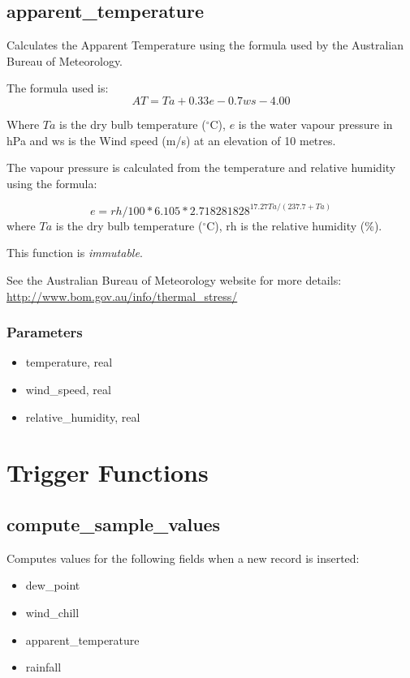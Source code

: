 \documentclass[a4paper,10pt]{book}
\begin{document}
\subsection{apparent\_temperature}
\label{apparent_temperature}
Calculates the Apparent Temperature using the formula used by the Australian Bureau of Meteorology.

The formula used is:
$$AT = Ta + 0.33e - 0.7ws - 4.00$$

Where $Ta$ is the dry bulb temperature ($^{\circ}$C), $e$ is the water vapour pressure in hPa and ws is the Wind speed (m/s) at an elevation of 10 metres.

The vapour pressure is calculated from the temperature and relative humidity using the formula:

$$  e = rh / 100 * 6.105 * 2.718281828 ^ { 17.27Ta / (237.7 + Ta ) }$$
where $Ta$ is the dry bulb temperature ($^{\circ}$C), rh is the relative humidity (\%).

This function is \emph{immutable}.

See the Australian Bureau of Meteorology website for more details: \\ \url{http://www.bom.gov.au/info/thermal_stress/}

\subsubsection{Parameters}
\begin{itemize}
\item temperature, real
\item wind\_speed, real
\item relative\_humidity, real
\end{itemize}

\section{Trigger Functions}
\label{trig_funcs}
\subsection{compute\_sample\_values}
\label{compute_sample_values}
Computes values for the following fields when a new record is inserted:
\begin{itemize}
\item dew\_point
\item wind\_chill
\item apparent\_temperature
\item rainfall
\end{itemize}
\end{document}
